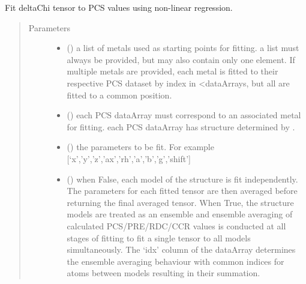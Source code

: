 \documentclass[a4paper,10pt,english,openany,oneside]{sphinxmanual}
\begin{document}
\begin{fulllineitems}
\label{\detokenize{reference/generated/paramagpy.fit.nlr_fit_metal_from_pcs:paramagpy.fit.nlr_fit_metal_from_pcs}}
Fit deltaChi tensor to PCS values using non-linear regression.
\begin{quote}\begin{description}
\item[{Parameters}] \leavevmode\begin{itemize}
\item {} 
 () \textendash{} a list of metals used as starting points for fitting.
a list must always be provided, but may also contain
only one element. If multiple metals are provided, each metal
is fitted to their respective PCS dataset by index in \textless{}dataArrays,
but all are fitted to a common position.

\item {} 
 () \textendash{} each PCS dataArray must correspond to an associated metal for fitting.
each PCS dataArray has structure determined by
{\hyperref[\detokenize{reference/generated/paramagpy.protein.CustomStructure.parse:paramagpy.protein.CustomStructure.parse}]{}}.

\item {} 
 () \textendash{} the parameters to be fit.
For example {[}‘x’,’y’,’z’,’ax’,’rh’,’a’,’b’,’g’,’shift’{]}

\item {} 
 (\sphinxstyleliteralemphasis{\sphinxupquote{, }}) \textendash{} when False, each model of the structure is fit independently.
The parameters for each fitted tensor are then averaged before
returning the final averaged tensor.
When True, the structure models are treated as an ensemble and
ensemble averaging of calculated PCS/PRE/RDC/CCR values is
conducted at all stages of fitting to fit a single tensor to all
models simultaneously. The ‘idx’ column of the dataArray
determines the ensemble averaging behaviour with common indices
for atoms between models resulting in their summation.


\end{itemize}
\end{description}
\end{quote}
\end{fulllineitems}
\end{document}

